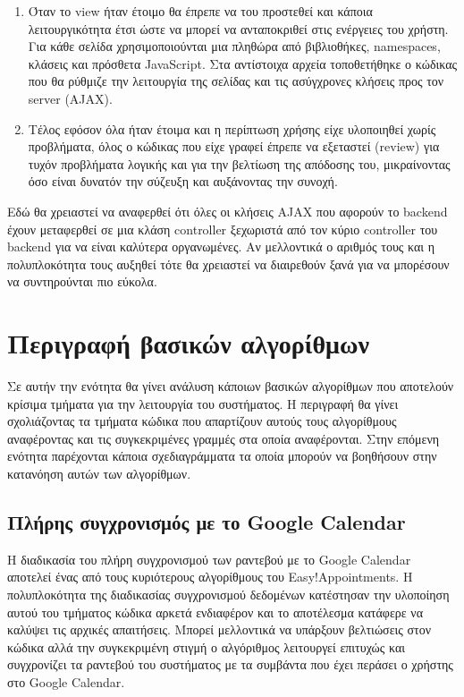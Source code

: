 \begin{enumerate}
\item Όταν το view ήταν έτοιμο θα έπρεπε να του προστεθεί και κάποια λειτουργικότητα έτσι ώστε να μπορεί να ανταποκριθεί στις ενέργειες του χρήστη. Για κάθε σελίδα χρησιμοποιούνται μια πληθώρα από βιβλιοθήκες, namespaces, κλάσεις και πρόσθετα JavaScript. Στα αντίστοιχα αρχεία τοποθετήθηκε ο κώδικας που θα ρύθμιζε την λειτουργία της σελίδας και τις ασύγχρονες κλήσεις προς τον server (AJAX). 
\item Τέλος εφόσον όλα ήταν έτοιμα και η περίπτωση χρήσης είχε υλοποιηθεί χωρίς προβλήματα, όλος ο κώδικας που είχε γραφεί έπρεπε να εξεταστεί (review) για τυχόν προβλήματα λογικής και για την βελτίωση της απόδοσης του, μικραίνοντας όσο είναι δυνατόν την σύζευξη και αυξάνοντας την συνοχή.
\end{enumerate}

Εδώ θα χρειαστεί να αναφερθεί ότι όλες οι κλήσεις AJAX που αφορούν το backend έχουν μεταφερθεί σε μια κλάση controller ξεχωριστά από τον κύριο controller του backend για να είναι καλύτερα οργανωμένες. Αν μελλοντικά ο αριθμός τους και η πολυπλοκότητα τους αυξηθεί τότε θα χρειαστεί να διαιρεθούν ξανά για να μπορέσουν να συντηρούνται πιο εύκολα.

\section{Περιγραφή βασικών αλγορίθμων}
Σε αυτήν την ενότητα θα γίνει ανάλυση κάποιων βασικών αλγορίθμων που αποτελούν κρίσιμα τμήματα για την λειτουργία του συστήματος. Η περιγραφή θα γίνει σχολιάζοντας τα τμήματα κώδικα που απαρτίζουν αυτούς τους αλγορίθμους αναφέροντας και τις συγκεκριμένες γραμμές στα οποία αναφέρονται. Στην επόμενη ενότητα παρέχονται κάποια σχεδιαγράμματα τα οποία μπορούν να βοηθήσουν στην κατανόηση αυτών των αλγορίθμων.

\subsection{Πλήρης συγχρονισμός με το Google Calendar}
Η διαδικασία του πλήρη συγχρονισμού των ραντεβού με το Google Calendar αποτελεί ένας από τους κυριότερους αλγορίθμους του Easy!Appointments. Η πολυπλοκότητα της διαδικασίας συγχρονισμού δεδομένων κατέστησαν την υλοποίηση αυτού του τμήματος κώδικα αρκετά ενδιαφέρον και το αποτέλεσμα κατάφερε να καλύψει τις αρχικές απαιτήσεις. Μπορεί μελλοντικά να υπάρξουν βελτιώσεις στον κώδικα αλλά την συγκεκριμένη στιγμή ο αλγόριθμος λειτουργεί επιτυχώς και συγχρονίζει τα ραντεβού του συστήματος με τα συμβάντα που έχει περάσει ο χρήστης στο Google Calendar.

